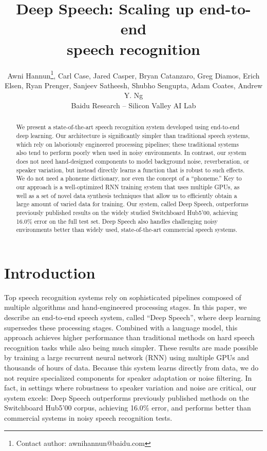 \documentclass{article}
\title{Deep Speech:  Scaling up end-to-end \\ speech recognition}
\author{Awni Hannun\thanks{Contact author:  awnihannun@baidu.com}, Carl Case, Jared Casper, Bryan Catanzaro, Greg Diamos, Erich Elsen, \And Ryan Prenger, Sanjeev Satheesh, Shubho Sengupta, Adam Coates, Andrew Y. Ng \\[10pt]
Baidu Research -- Silicon Valley AI Lab
}
\begin{document}
 
\maketitle
\vskip -0.2in
\begin{abstract} 

We present a state-of-the-art speech recognition system developed using
end-to-end deep learning.  Our architecture is significantly simpler than
traditional speech systems, which rely on laboriously engineered processing
pipelines; these traditional systems also tend to perform poorly when used in
noisy environments.  In contrast, our system does not need hand-designed
components to model background noise, reverberation, or speaker variation, but
instead directly learns a function that is robust to such effects.  We do not
need a phoneme dictionary, nor even the concept of a ``phoneme.''  Key to our
approach is a well-optimized RNN training system that uses multiple GPUs, as
well as a set of novel data synthesis techniques that allow us to efficiently
obtain a large amount of varied data for training.  Our system, called Deep
Speech, outperforms previously published results on the widely studied
Switchboard Hub5'00, achieving 16.0\% error on the full test set.  Deep Speech
also handles challenging noisy environments better than widely used,
state-of-the-art commercial speech systems. 

\end{abstract}

\section{Introduction}
\label{sec:introduction}

Top speech recognition systems rely on sophisticated pipelines composed of
multiple algorithms and hand-engineered processing stages.  In this paper, we
describe an end-to-end speech system, called ``Deep Speech'', where deep
learning supersedes these processing stages.  Combined with a language model,
this approach achieves higher performance than traditional methods on hard
speech recognition tasks while also being much simpler.  These results are made
possible by training a large recurrent neural network (RNN) using multiple GPUs
and thousands of hours of data.  Because this system learns directly from data,
we do not require specialized components for speaker adaptation or noise
filtering.  In fact, in settings where robustness to speaker variation and
noise are critical, our system excels:  Deep Speech outperforms previously
published methods on the Switchboard Hub5'00 corpus, achieving 16.0\% error,
and performs better than commercial systems in noisy speech recognition tests.
\end{document}
